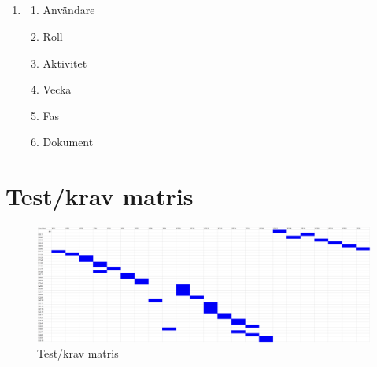 \documentclass[paper=a4, fontsize=11pt,twoside]{article}
\begin{document}
\newpage

\subsection{ }

\begin{enumerate}
\item[]
	\begin{enumerate}
	\item Användare
	\item Roll
	\item Aktivitet
	\item Vecka
	\item Fas
	\item Dokument
	\end{enumerate}
\end{enumerate}


\section{Test/krav matris}
\begin{figure}[H]
\centering
\includegraphics[width = 16cm]{SVVS_Matris2.png} %
\caption{Test/krav matris}
\end{figure}
\end{document}
